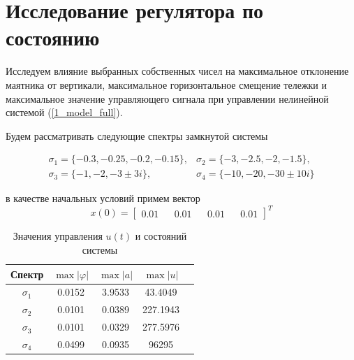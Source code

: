 \section{Исследование регулятора по состоянию}

Исследуем влияние выбранных собственных чисел на максимальное отклонение маятника от вертикали, максимальное горизонтальное смещение тележки и максимальное значение управляющего сигнала при управлении нелинейной системой (\ref{1_model_full}).

Будем рассматривать следующие спектры замкнутой системы

\begin{equation*}
  \begin{matrix}
      \sigma_1 = \{ -0.3, -0.25, -0.2, -0.15 \}, & \sigma_2 = \{ -3, -2.5, -2, -1.5 \},\\
      \sigma_3 = \{ -1, -2, -3 \pm 3i \}, & \sigma_4 = \{ -10, -20, -30 \pm 10i \}
 \end{matrix}
\end{equation*}

в качестве начальных условий примем вектор $$x(0) = \begin{bmatrix}
    0.01&&
    0.01&&
    0.01&&
    0.01
\end{bmatrix}^T$$

\begin{table}[h]
\centering
\caption{Значения управления \( u(t) \) и состояний системы}
\label{tab:results}
\begin{tabular}{ccccc}
\toprule
Спектр & $\max |\varphi|$ & $\max |a|$ & $\max |u|$ \\
\midrule
$\sigma_1$  &  0.0152  &  3.9533  &  43.4049  \\
$\sigma_2$  &  0.0101  &  0.0389  &  227.1943  \\
$\sigma_3$  &  0.0101  &  0.0329  &  277.5976  \\
$\sigma_4$  &  0.0499  &  0.0935  &  96295  \\
\bottomrule
\end{tabular}
\end{table}

